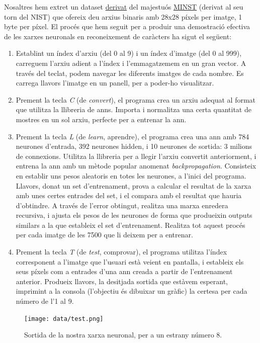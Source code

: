 Nosaltres hem extret un dataset \href{http://cis.jhu.edu/~sachin/digit/digit.html}{derivat} del majestuós \href{http://yann.lecun.com/exdb/mnist/}{MINST} (derivat al seu torn del NIST)
que ofereix deu arxius binaris amb 28x28 píxels per imatge, 1 byte per píxel. El procés que hem seguit per a produir una demostració efectiva de les 
xarxes neuronals en reconeixement de caràcters ha sigut el següent:

\begin{enumerate}
\item Establint un índex d'arxiu (del 0 al 9) i un índex d'imatge (del 0 al 999), carreguem l'arxiu adient a l'índex i l'emmagatzemem en un gran vector. A través del teclat, podem
navegar les diferents imatges de cada nombre. Es carrega llavors l'imatge en un panell, per a poder-ho visualitzar.
\item Prement la tecla \emph{C} (de \emph{convert}), el programa crea un arxiu adequat al format que utilitza la llibreria de \ac{ann}s. Importa i normalitza una certa quantitat 
de mostres en un sol arxiu, perfecte per a entrenar la \ac{ann}.
\item Prement la tecla \emph{L} (de \emph{learn}, aprendre), el programa crea una \ac{ann} amb 784 neurones d'entrada, 392 neurones hidden, i 10 neurones de sortida: 3 milions de connexions. Utilitza la 
llibreria per a llegir l'arxiu convertit anteriorment, i entrena la \ac{ann} amb un mètode popular anomenat \emph{backpropagation}. Consisteix en establir uns pesos aleatoris 
en totes les neurones, a l'inici del programa. Llavors, donat un set d'entrenament, prova a calcular el resultat de la xarxa amb unes certes entrades del set, i el compara amb el resultat
que hauria d'obtindre. A través de l'error obtingut, realitza una marxa enredera recursiva, i ajusta els pesos de les neurones de forma que produeixin outputs similars a la que
estableix el set d'entrenament. Realitza tot aquest procés per cada imatge de les 7500 que li deixem per a entrenar.
\item Prement la tecla \emph{T} (de \emph{test}, comprovar), el programa utilitza l'índex corresponent a l'imatge que l'usuari està veient en pantalla, i estableix els seus píxels
com a entrades d'una \ac{ann} creada a partir de l'entrenament anterior. Produeix llavors, la desitjada sortida que estàvem esperant, imprimint a la consola (l'objectiu és dibuixar un gràfic)
la certesa per cada número de l'1 al 9.
\end{enumerate}


\begin{figure}[ht!]
\centering
\texttt{[image: data/test.png]}
\caption{Sortida de la nostra xarxa neuronal, per a un estrany número 8.}
\label{output}
\end{figure}